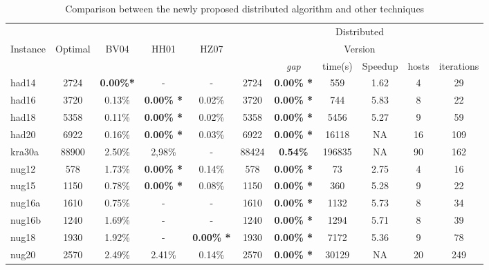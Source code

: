 \documentclass[authoryear,12pt,a4paper,times]{elsarticle}
\begin{document}
\begin{table}[!htb]
\scriptsize
\caption{ Comparison between the newly proposed distributed algorithm and other techniques }
\centering
\begin{tabular}{l|c|c|c|c|c|c|c|c|c|c} \hline
         &         &              &               &                 & \multicolumn{6}{c}{Distributed}  \\            
Instance & Optimal & BV04         & HH01          & HZ07            & \multicolumn{6}{c}{Version}  \\ \cline{6-11}
         &         &              &               &                 &           &  \textit{gap}   & time(s)  & Speedup & hosts & iterations   \\    \hline \hline
had14    & 2724    & {\bf 0.00\%*} &  -            & -              &  2724       & {\bf 0.00\% *} & 559       &  1.62   &  4    & 29 \\ 
had16    & 3720    & 0.13\%       & {\bf 0.00\% *} & 0.02\%         &  3720       & {\bf 0.00\% *} & 744       &  5.83   &  8    & 22  \\ 
had18    & 5358    & 0.11\%       & {\bf 0.00\% *} & 0.02\%         &  5358       & {\bf 0.00\% *} & 5456      &  5.27   &  9    & 59 \\ 
had20    & 6922    & 0.16\%       & {\bf 0.00\% *} & 0.03\%         &  6922       & {\bf 0.00\% *} & 16118     &   NA    & 16    & 109  \\ \hline 
kra30a   & 88900   & 2.50\%       & 2,98\%         & -              &  88424      & {\bf 0.54\% }  & 196835    &   NA    & 90    & 162 \\ \hline
nug12    & 578     & 1.73\%       & {\bf 0.00\% *} & 0.14\%         &  578        & {\bf 0.00\% *} & 73        &  2.75   &  4    & 16 \\ 
nug15    & 1150    & 0.78\%       & {\bf 0.00\% *} & 0.08\%         &  1150       & {\bf 0.00\% *} & 360       &  5.28   &  9    & 22  \\  
nug16a   & 1610    & 0.75\%       & -             &  -              &  1610       & {\bf 0.00\% *} & 1132      &  5.73   &  8    & 34 \\ 
nug16b   & 1240    & 1.69\%       & -             &  -              &  1240       & {\bf 0.00\% *} & 1294      &  5.71   &  8    & 39 \\ 
nug18    & 1930    & 1.92\%       & -             & {\bf 0.00\% *}  &  1930       & {\bf 0.00\% *} & 7172      &  5.36   &  9    & 78 \\ 
nug20    & 2570    & 2.49\%       & 2.41\%        & 0.14\%          &  2570       & {\bf 0.00\% *} & 30129     &   NA    & 20    & 249 \\ 

\end{tabular}
\end{table}
\end{document}

